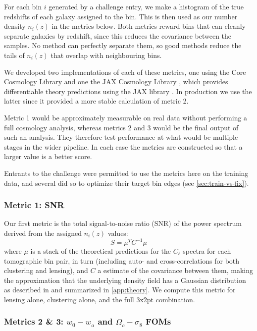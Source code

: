 \documentclass[twocolumn,twocolappendix]{aastex63}
\begin{document}
For each bin $i$ generated by a challenge entry, we make a histogram of the true redshifts 
of each galaxy assigned to the bin.  This is then used as our number density $n_i(z)$ in the metrics 
below. Both metrics reward bins that can
cleanly separate galaxies by redshift, since this reduces the covariance between the samples. No
method can perfectly separate them, so good methods reduce the tails of $n_i(z)$ that overlap with 
neighbouring bins.

We developed two implementations of each of these metrics, one using the Core Cosmology Library 
\citep{ccl} and one the JAX Cosmology Library \citep{jax-cosmo}, which provides differentiable theory 
predictions using the JAX library \citep{jax}.  In production we use the latter since it provided a
more stable calculation of metric 2.

Metric 1 would be approximately measurable on real data without performing a full cosmology analysis,
whereas metrics 2 and 3 would be the final output of such an analysis.  They therefore test performance at what
would be multiple stages in the wider pipeline. In each case the metrics are constructed so that a larger
value is a better score.

Entrants to the challenge were permitted to use the metrics here on the training data, and several did
so to optimize their target bin edges (see \autoref{sec:train-vs-fix}).

\subsubsection{Metric 1: SNR}

Our first metric is the total signal-to-noise ratio (SNR) of the power spectrum derived from the assigned
$n_i(z)$ values:
\begin{equation}
    S = \mu^{T} C^{-1} \mu
\label{eq:snr}
\end{equation}
where $\mu$ is a stack of the theoretical predictions for the $C_\ell$ spectra for each tomographic 
bin pair, in turn (including auto- and cross-correlations for both clustering and lensing), and $C$ a estimate of the covariance between them, making the approximation that the underlying density field has a Gaussian distribution as described in
\citet{takada_jain} and summarized in \autoref{app:theory}.   We compute this metric for lensing alone, clustering alone, and the full 3x2pt combination.

\subsubsection{Metrics 2 \& 3: $w_{0}-w_{a}$ and $\Omega_c-\sigma_8$ FOMs}
\end{document}
